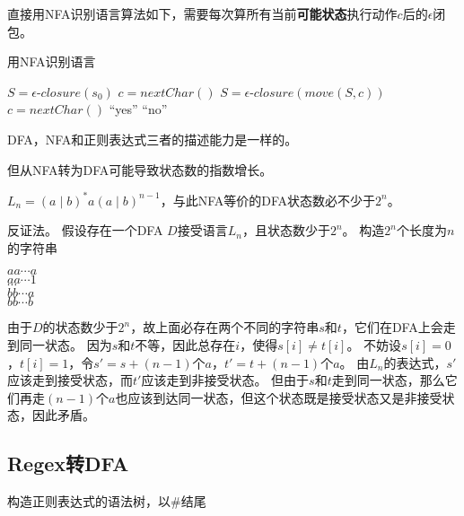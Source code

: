 直接用NFA识别语言算法如下，需要每次算所有当前\textbf{可能状态}执行动作$c$后的$\epsilon$闭包。
\begin{algorithm}[H]
\centering
\caption{用NFA识别语言}
\begin{algorithmic}[1]
\State $S=\epsilon$-$closure(s_0)$
\State $c=nextChar()$
\State $S=\epsilon$-$closure(move(S,c))$
\State $c=nextChar()$
\EndWhile
{}
\State\Return ``yes''
\Else
\State\Return ``no''
\EndIf
\end{algorithmic}
\end{algorithm}

\begin{theorem}
DFA，NFA和正则表达式三者的描述能力是一样的。
\end{theorem}

但从NFA转为DFA可能导致状态数的指数增长。
\begin{example}
$L_n=(a\mid b)^*a(a\mid b)^{n-1}$，与此NFA等价的DFA状态数必不少于$2^n$。
\end{example}
\begin{analysis}
反证法。
假设存在一个DFA $D$接受语言$L_n$，且状态数少于$2^n$。
构造$2^n$个长度为$n$的字符串
\begin{flushleft}
$aa\cdots a$\\
$aa\cdots 1$\\
$\cdots$\\
$bb\cdots a$\\
$bb\cdots b$
\end{flushleft}
由于$D$的状态数少于$2^n$，故上面必存在两个不同的字符串$s$和$t$，它们在DFA上会走到同一状态。
因为$s$和$t$不等，因此总存在$i$，使得$s[i]\ne t[i]$。
不妨设$s[i]=0$，$t[i]=1$，令$s'=s+(n-1)$个$a$，$t'=t+(n-1)$个$a$。
由$L_n$的表达式，$s'$应该走到接受状态，而$t'$应该走到非接受状态。
但由于$s$和$t$走到同一状态，那么它们再走$(n-1)$个$a$也应该到达同一状态，但这个状态既是接受状态又是非接受状态，因此矛盾。
\end{analysis}

\subsection{Regex转DFA}
构造正则表达式的语法树，以\#结尾

